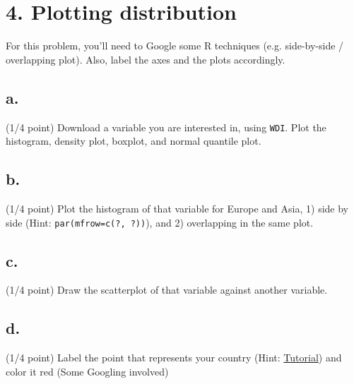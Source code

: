 \documentclass{article}\usepackage[]{graphicx}\usepackage[]{color}
\begin{document}
\section*{4. Plotting distribution}

For this problem, you'll need to Google some R techniques (e.g. side-by-side / overlapping plot). Also, label the axes and the plots accordingly.

\subsection*{a.} (1/4 point) Download a variable you are interested in, using \verb`WDI`. Plot the histogram, density plot, boxplot, and normal quantile plot.

\subsection*{b.} (1/4 point) Plot the histogram of that variable for Europe and Asia, 1) side by side (Hint: \verb`par(mfrow=c(?, ?))`), and 2) overlapping in the same plot.

\subsection*{c.} (1/4 point) Draw the scatterplot of that variable against another variable.

\subsection*{d.} (1/4 point) Label the point that represents your country (Hint: \href{https://chemicalstatistician.wordpress.com/2013/03/02/adding-labels-to-points-in-a-scatter-plot-in-r/}{Tutorial}) and color it red (Some Googling involved)
\end{document}

